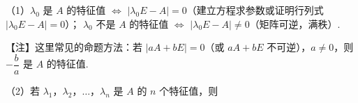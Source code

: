%






（1）$\lambda_0$ 是 $A$ 的特征值 $\iff$ $|\lambda_0E-A|=0$（建立方程求参数或证明行列式 $|\lambda_0E-A|=0$）；
$\lambda_0$ 不是 $A$ 的特征值 $\iff$ $|\lambda_0E-A|\ne0$（矩阵可逆，满秩）.


\begin{fnote}
【注】这里常见的命题方法：若 $|aA+bE|=0$（或 $aA+bE$ 不可逆），$a\ne0$，则 $-\dfrac{b}{a}$ 是 $A$ 的特征值.
\end{fnote}


（2）若 $\lambda_1$，$\lambda_2$，$\dots$，$\lambda_n$ 是 $A$ 的 $n$ 个特征值，则

